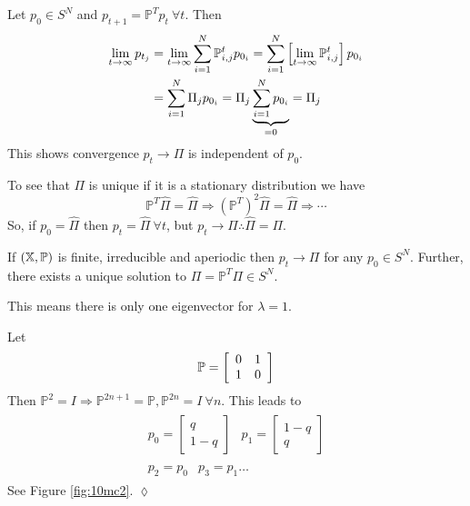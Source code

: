 \documentclass[lecture,12pt,]{pcms-l}
\begin{document}
Let $p_0\in S^N$ and $p_{t+1}=\mathbb{P}^Tp_t ~\forall t$. Then
\begin{align*}
\lim_{t\to\infty}p_{t_j} &= \lim_{t\to\infty}\sum_{i=1}^N\mathbb{P}_{i,j}^tp_{0_i} = \sum_{i=1}^N\left[\lim_{t\to\infty}\mathbb{P}_{i,j}^t\right]p_{0_i} \\
&= \sum_{i=1}^N\Pi_jp_{0_i} = \Pi_j\underbrace{\sum_{i=1}^Np_{0_i}}_{=0} = \Pi_j
\end{align*}
This shows convergence $p_t\rightarrow\Pi$ is independent of $p_0$.

To see that $\Pi$ is unique if it is a stationary distribution we have
$$\mathbb{P}^T\hat{\Pi} = \hat{\Pi} \Rightarrow (\mathbb{P}^T)^2\hat{\Pi} = \hat{\Pi} \Rightarrow \cdots$$
So, if $p_0=\hat{\Pi}$ then $p_t=\hat{\Pi} ~\forall t$, but $p_t\rightarrow\Pi \therefore \hat{\Pi}=\Pi$.

\begin{corollary}
If $(\mathbb{X},\mathbb{P})$ is finite, irreducible and aperiodic then $p_t\rightarrow\Pi$ for any $p_0\in S^N$. Further, there exists a unique solution to $\Pi=\mathbb{P}^T\Pi \in S^N$.
\end{corollary}
This means there is only one eigenvector for $\lambda=1$.

\begin{example}
Let
$$\mathbb{P} = \left[\begin{array}{c c} 0 & 1 \\ 1 & 0 \end{array}\right]$$
Then $\mathbb{P}^2=I \Rightarrow \mathbb{P}^{2n+1}=\mathbb{P}, \mathbb{P}^{2n}=I ~\forall n$. This leads to
\begin{align*}
\begin{split}
p_0 = \left[\begin{array}{c} q \\ 1-q \end{array}\right]
\end{split}
\begin{split}
p_1 = \left[\begin{array}{c} 1-q \\ q \end{array}\right]
\end{split} \\
\begin{split}
p_2=p_0
\end{split}
\begin{split}
p_3=p_1\ldots
\end{split}
\end{align*}
See Figure \ref{fig:10mc2}.
$\lozenge$
\end{example}
\end{document}
